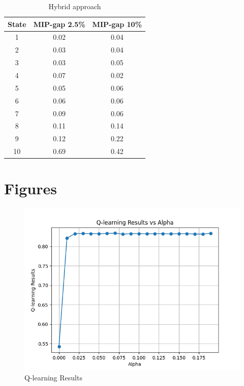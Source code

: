 \documentclass{article}
\begin{document}
\begin{appendices}
\begin{table}[ht]
\centering
\caption{Hybrid approach}
\label{tab: Hybrid Q-table}
\begin{tabular}{|c|c|c|}
\hline
State & MIP-gap 2.5\% & MIP-gap 10\% \\
\hline
1 & 0.02 & 0.04 \\
2 & 0.03 & 0.04 \\
3 & 0.03 & 0.05 \\
4 & 0.07 & 0.02 \\
5 & 0.05 & 0.06 \\
6 & 0.06 & 0.06 \\
7 & 0.09 & 0.06 \\
8 & 0.11 & 0.14 \\
9 & 0.12 & 0.22 \\
10 & 0.69 & 0.42 \\
\hline
\end{tabular}
\end{table}

\newpage
\section*{Figures}
\begin{figure}[h]
    \centering
    \includegraphics[width=\linewidth]{Q_learning_results.png}
    \caption{Q-learning Results}
    \label{fig:q-learning-results}
\end{figure}
\end{appendices}
\end{document}
